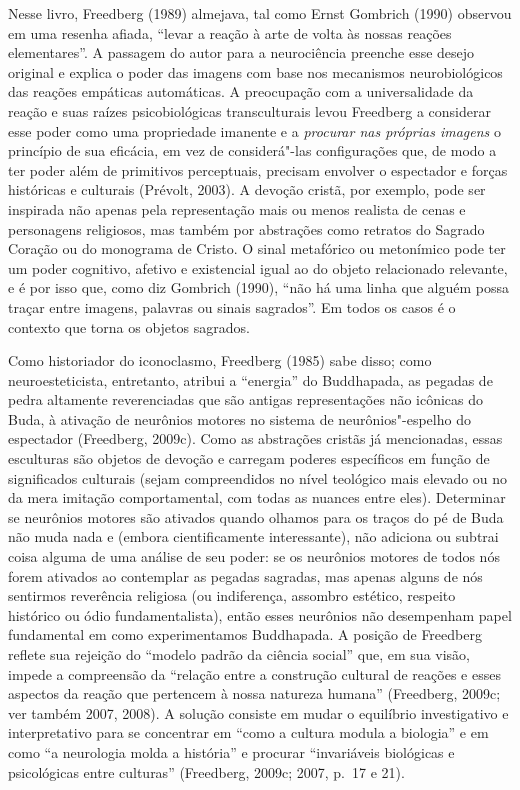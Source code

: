 Nesse livro, Freedberg (1989) almejava, tal como Ernst Gombrich (1990)
observou em uma resenha afiada, ``levar a reação à arte de volta às
nossas reações elementares''. A passagem do autor para a neurociência
preenche esse desejo original e explica o poder das imagens com base nos
mecanismos neurobiológicos das reações empáticas automáticas. A
preocupação com a universalidade da reação e suas raízes psicobiológicas
transculturais levou Freedberg a considerar esse poder como uma
propriedade imanente e a \emph{procurar nas próprias imagens} o
princípio de sua eficácia, em vez de considerá"-las configurações que, de
modo a ter poder além de primitivos perceptuais, precisam envolver o
espectador e forças históricas e culturais (Prévolt, 2003). A devoção
cristã, por exemplo, pode ser inspirada não apenas pela representação
mais ou menos realista de cenas e personagens religiosos, mas também por
abstrações como retratos do Sagrado Coração ou do monograma de Cristo. O
sinal metafórico ou metonímico pode ter um poder cognitivo, afetivo e
existencial igual ao do objeto relacionado relevante, e é por isso que,
como diz Gombrich (1990), ``não há uma linha que alguém possa traçar
entre imagens, palavras ou sinais sagrados''. Em todos os casos é o
contexto que torna os objetos sagrados.

Como historiador do iconoclasmo, Freedberg (1985) sabe disso; como
neuroesteticista, entretanto, atribui a ``energia'' do Buddhapada, as
pegadas de pedra altamente reverenciadas que são antigas representações
não icônicas do Buda, à ativação de neurônios motores no sistema de
neurônios"-espelho do espectador (Freedberg, 2009c). Como as abstrações
cristãs já mencionadas, essas esculturas são objetos de devoção e
carregam poderes específicos em função de significados culturais (sejam
compreendidos no nível teológico mais elevado ou no da mera imitação
comportamental, com todas as nuances entre eles). Determinar se
neurônios motores são ativados quando olhamos para os traços do pé de
Buda não muda nada e (embora cientificamente interessante), não adiciona
ou subtrai coisa alguma de uma análise de seu poder: se os neurônios
motores de todos nós forem ativados ao contemplar as pegadas sagradas,
mas apenas alguns de nós sentirmos reverência religiosa (ou indiferença,
assombro estético, respeito histórico ou ódio fundamentalista), então
esses neurônios não desempenham papel fundamental em como experimentamos
Buddhapada. A posição de Freedberg reflete sua rejeição do ``modelo
padrão da ciência social'' que, em sua visão, impede a compreensão da
``relação entre a construção cultural de reações e esses aspectos da
reação que pertencem à nossa natureza humana'' (Freedberg, 2009c; ver
também 2007, 2008). A solução consiste em mudar o equilíbrio
investigativo e interpretativo para se concentrar em ``como a cultura
modula a biologia'' e em como ``a neurologia molda a história'' e
procurar ``invariáveis biológicas e psicológicas entre culturas''
(Freedberg, 2009c; 2007, p.~17 e 21).

